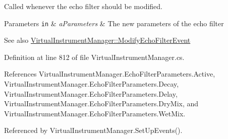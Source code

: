 Called whenever the echo filter should be modified. 


\begin{DoxyParams}[1]{Parameters}
\mbox{\tt in}  & {\em a\+Parameters} & The new parameters of the echo filter\\
\hline
\end{DoxyParams}
\begin{DoxySeeAlso}{See also}
\hyperlink{group___v_i_m_event_types_class_virtual_instrument_manager_1_1_modify_echo_filter_event}{Virtual\+Instrument\+Manager\+::\+Modify\+Echo\+Filter\+Event} 
\end{DoxySeeAlso}


Definition at line 812 of file Virtual\+Instrument\+Manager.\+cs.



References Virtual\+Instrument\+Manager.\+Echo\+Filter\+Parameters.\+Active, Virtual\+Instrument\+Manager.\+Echo\+Filter\+Parameters.\+Decay, Virtual\+Instrument\+Manager.\+Echo\+Filter\+Parameters.\+Delay, Virtual\+Instrument\+Manager.\+Echo\+Filter\+Parameters.\+Dry\+Mix, and Virtual\+Instrument\+Manager.\+Echo\+Filter\+Parameters.\+Wet\+Mix.



Referenced by Virtual\+Instrument\+Manager.\+Set\+Up\+Events().


